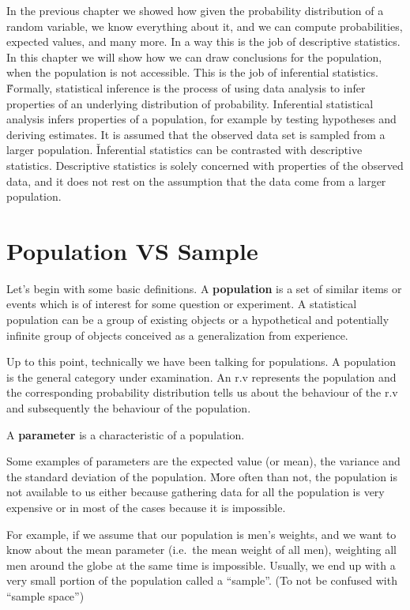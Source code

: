 In the previous chapter we showed how given the probability distribution of a random variable, we know everything
about it, and we can compute probabilities, expected values, and many more. In a way this is the job of descriptive
statistics. In this chapter we will show how we can draw conclusions for the population, when the population is not
accessible. This is the job of inferential statistics. \v

Formally, statistical inference is the process of using data analysis to infer properties of an underlying
distribution of probability. Inferential statistical analysis infers properties of a population, for example by
testing hypotheses and deriving estimates. It is assumed that the observed data set is sampled from a larger
population. \v

Inferential statistics can be contrasted with descriptive statistics. Descriptive statistics is solely concerned with
properties of the observed data, and it does not rest on the assumption that the data come from a larger population.

\section{Population VS Sample}

Let's begin with some basic definitions.
\bd[Population]
A \textbf{population} is a set of similar items or events which is of interest for some question or experiment. A
statistical population can be a group of existing objects or a hypothetical and potentially infinite group of objects
conceived as a generalization from experience.
\ed

Up to this point, technically we have been talking for populations. A population is the general category under
examination. An r.v represents the population and the corresponding probability distribution tells us about the
behaviour of the r.v and subsequently the behaviour of the population.

\bd[Parameter]
A \textbf{parameter} is a characteristic of a population.
\ed

Some examples of parameters are the expected value (or mean), the variance and the standard deviation of the
population. \v

More often than not, the population is not available to us either because gathering data for all the population is
very expensive or in most of the cases because it is impossible.

\be
For example, if we assume that our population is men's weights, and we want to know about the mean parameter (i.e.\ the
mean weight of all men), weighting all men around the globe at the same time is impossible. Usually, we end up with a
very small portion of the population called a ``sample''. (To not be confused with ``sample space'')
\ee

